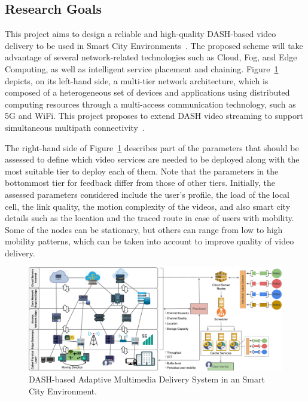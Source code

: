 
\subsection*{Research Goals}
\label{sec:research-goals}

This project aims to design a reliable and high-quality DASH-based video delivery to be used in Smart City Environments~\cite{gamaUCC2019, KreuzbergerWorkshop2016}. The proposed scheme will take advantage of several network-related technologies such as Cloud, Fog, and Edge Computing, as well as intelligent service placement and chaining. Figure~\ref{fig:scenario-arch} depicts, on its left-hand side, a multi-tier network architecture, which is composed of a heterogeneous set of devices and applications using distributed computing resources through a multi-access communication technology, such as 5G and WiFi. This project proposes to extend DASH video streaming to support simultaneous multipath connectivity~\cite{poliakovPHD2018, Velasquez2018}.

The right-hand side of Figure~\ref{fig:scenario-arch} describes part of the parameters that should be assessed to define which video services are needed to be deployed along with the most suitable tier to deploy each of them. Note that the parameters in the bottommost tier for feedback differ from those of other tiers. Initially, the assessed parameters considered include the user's profile, the load of the local cell, the link quality, the motion complexity of the videos, and also smart city details such as the location and the traced route in case of users with mobility. Some of the nodes can be stationary, but others can range from low to high mobility patterns, which can be taken into account to improve quality of video delivery.

\vspace{0.8cm}
\begin{figure}[htpb]
	\centering
	\includegraphics[width=1.0\textwidth]{images/scenario_incomplete}
	\caption{DASH-based Adaptive Multimedia Delivery System in an Smart City Environment.}
	\label{fig:scenario-arch}
\end{figure}

